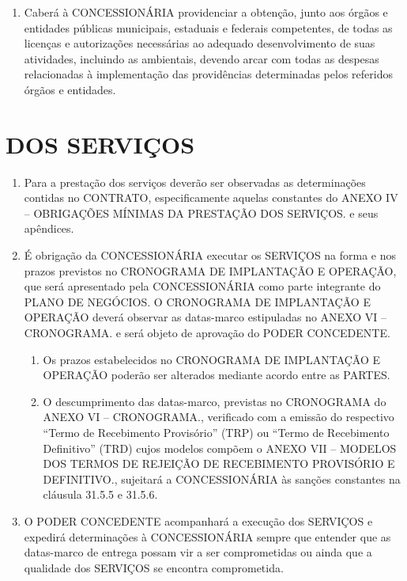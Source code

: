 \documentclass[a4paper,11pt]{report} %
\begin{document}
\begin{enumerate}
\item \label{itm:MH6K} Caberá à CONCESSIONÁRIA providenciar a obtenção, junto aos órgãos e entidades públicas municipais, estaduais e federais competentes, de todas as licenças e autorizações necessárias ao adequado desenvolvimento de suas atividades, incluindo as ambientais, devendo arcar com todas as despesas relacionadas à implementação das providências determinadas pelos referidos órgãos e entidades.
\end{enumerate}

\section{DOS SERVIÇOS}
\label{sec:7TN8}

\begin{enumerate}
\item \label{itm:DQSD}	Para a prestação dos serviços deverão ser observadas as determinações contidas no CONTRATO, especificamente aquelas constantes do ANEXO IV – OBRIGAÇÕES MÍNIMAS DA PRESTAÇÃO DOS SERVIÇOS. e seus apêndices.

\item \label{itm:4HXB}	É obrigação da CONCESSIONÁRIA executar os SERVIÇOS na forma e nos prazos previstos no CRONOGRAMA DE IMPLANTAÇÃO E OPERAÇÃO, que será apresentado pela CONCESSIONÁRIA como parte integrante do PLANO DE NEGÓCIOS. O CRONOGRAMA DE IMPLANTAÇÃO E OPERAÇÃO deverá observar as datas-marco estipuladas no ANEXO VI – CRONOGRAMA. e será objeto de aprovação do PODER CONCEDENTE. 

\begin{enumerate}[label*=\arabic*.]
\item \label{itm:L34J}	Os prazos estabelecidos no CRONOGRAMA DE IMPLANTAÇÃO E OPERAÇÃO poderão ser alterados mediante acordo entre as PARTES.
\item \label{itm:SVW2} O descumprimento das datas-marco, previstas no CRONOGRAMA do ANEXO VI – CRONOGRAMA., verificado com a emissão do respectivo “Termo de Recebimento Provisório” (TRP) ou “Termo de Recebimento Definitivo” (TRD) cujos modelos compõem o ANEXO VII – MODELOS DOS TERMOS DE REJEIÇÃO DE RECEBIMENTO PROVISÓRIO E DEFINITIVO.,  sujeitará a CONCESSIONÁRIA às sanções constantes na cláusula 31.5.5 e 31.5.6.
\end{enumerate}

\item \label{itm:TYUV}	O PODER CONCEDENTE acompanhará a execução dos SERVIÇOS e expedirá determinações à CONCESSIONÁRIA sempre que entender que as datas-marco de entrega possam vir a ser comprometidas ou ainda que a qualidade dos SERVIÇOS se encontra comprometida.


\end{enumerate}
\end{document}
